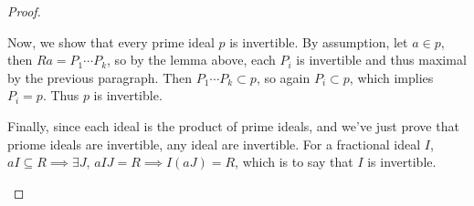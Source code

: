\begin{theorem}
\begin{proof}
\begin{description}
        Now, we show that every prime ideal $p$ is invertible. By assumption,
        let $a \in p$, then $Ra = P_1 \dotsm P_k$, so by the lemma above,
        each $P_i$ is invertible and thus maximal by the previous paragraph.
        Then $P_1 \dotsm P_k \subset p$, so again $P_i \subset p$, which
        implies $P_i = p$. Thus $p$ is invertible.

        Finally, since each ideal is the product of prime ideals,
        and we've just prove that priome ideals are invertible,
        any ideal are invertible. For a fractional ideal $I$,
        $aI \subseteq R \implies \exists J, \, aIJ = R \implies I(aJ) = R$,
        which is to say that $I$ is invertible.
  \end{description}
  \end{proof}
\end{theorem}
